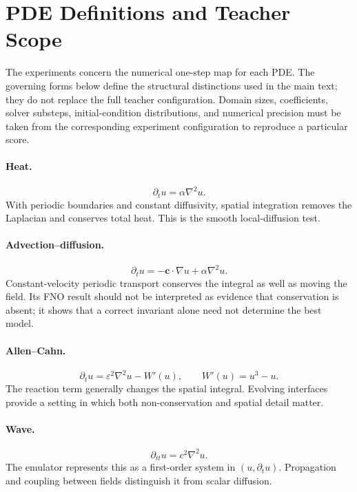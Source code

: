 \section{PDE Definitions and Teacher Scope}
\label{sec:equations}
The experiments concern the numerical one-step map for each PDE. The governing
forms below define the structural distinctions used in the main text; they do not
replace the full teacher configuration. Domain sizes, coefficients, solver
substeps, initial-condition distributions, and numerical precision must be taken
from the corresponding experiment configuration to reproduce a particular score.

\paragraph{Heat.}
\begin{equation}
 \partial_t u=\alpha\nabla^2u.
\end{equation}
With periodic boundaries and constant diffusivity, spatial integration removes the
Laplacian and conserves total heat. This is the smooth local-diffusion test.

\paragraph{Advection--diffusion.}
\begin{equation}
 \partial_t u=-\mathbf{c}\cdot\nabla u+\alpha\nabla^2u.
\end{equation}
Constant-velocity periodic transport conserves the integral as well as moving the
field. Its FNO result should not be interpreted as evidence that conservation is
absent; it shows that a correct invariant alone need not determine the best model.

\paragraph{Allen--Cahn.}
\begin{equation}
 \partial_t u=\varepsilon^2\nabla^2u-W'(u),\qquad W'(u)=u^3-u.
\end{equation}
The reaction term generally changes the spatial integral. Evolving interfaces
provide a setting in which both non-conservation and spatial detail matter.

\paragraph{Wave.}
\begin{equation}
 \partial_{tt}u=c^2\nabla^2u.
\end{equation}
The emulator represents this as a first-order system in $(u,\partial_tu)$.
Propagation and coupling between fields distinguish it from scalar diffusion.


